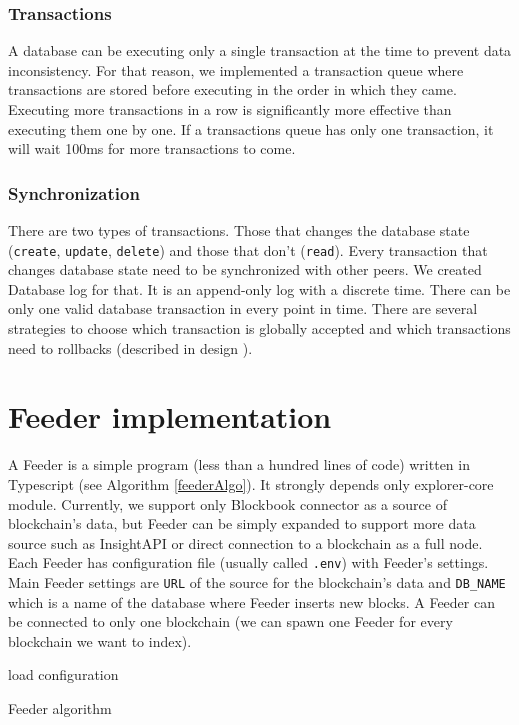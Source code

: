 \subsubsection{Transactions}
A database can be executing only a single transaction at the time to prevent data inconsistency. For that reason, we implemented a transaction queue where transactions are stored before executing in the order in which they came. Executing more transactions in a row is significantly more effective than executing them one by one. If a transactions queue has only one transaction, it will wait 100ms for more transactions to come.  

\subsubsection{Synchronization}
There are two types of transactions. Those that changes the database state (\texttt{create}, \texttt{update}, \texttt{delete}) and those that don't (\texttt{read}). Every transaction that changes database state need to be synchronized with other peers. We created Database log for that. It is an append-only log with a discrete time. There can be only one valid database transaction in every point in time. There are several strategies to choose which transaction is globally accepted and which transactions need to rollbacks (described in design ).




\section{Feeder implementation}
A Feeder is a simple program (less than a hundred lines of code) written in Typescript (see Algorithm \ref{feederAlgo}). It strongly depends only explorer-core module. Currently, we support only Blockbook connector as a source of blockchain's data, but Feeder can be simply expanded to support more data source such as InsightAPI or direct connection to a blockchain as a full node. Each Feeder has configuration file (usually called \texttt{.env}) with Feeder's settings. Main Feeder settings are \texttt{URL} of the source for the blockchain's data and \texttt{DB\_NAME} which is a name of the database where Feeder inserts new blocks. A Feeder can be connected to only one blockchain (we can spawn one Feeder for every blockchain we want to index).



\begin{algorithm}[H]
    \SetAlgoLined
    load configuration\;
    \caption{Feeder algorithm}
    \label{feederAlgo}
\end{algorithm}



